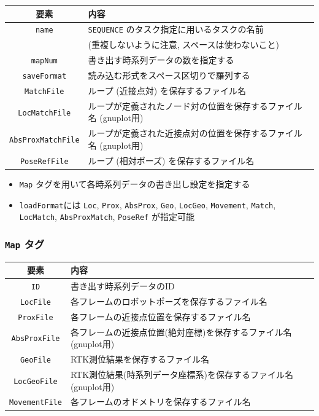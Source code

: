 \documentclass[dvipdfmx]{jsarticle}
\begin{document}
\begin{tabular}{c|l}
	\hline
	要素 & 内容 \\
	\hline \hline
	\verb|name| & \verb|SEQUENCE| のタスク指定に用いるタスクの名前 \vspace{-5pt}\\
		& (重複しないように注意, スペースは使わないこと) \\
	\verb|mapNum|  & 書き出す時系列データの数を指定する \\
	\verb|saveFormat|  & 読み込む形式をスペース区切りで羅列する \\
	\verb|MatchFile|  & ループ (近接点対) を保存するファイル名 \\
	\verb|LocMatchFile|  & ループが定義されたノード対の位置を保存するファイル名 (gnuplot用) \\
	\verb|AbsProxMatchFile|  & ループが定義された近接点対の位置を保存するファイル名 (gnuplot用) \\
	\verb|PoseRefFile|  & ループ (相対ポーズ) を保存するファイル名 \\
	\hline
\end{tabular}

\begin{itemize}
	\item \verb|Map| タグを用いて各時系列データの書き出し設定を指定する
	\item \verb|loadFormat|には \verb|Loc|, \verb|Prox|, \verb|AbsProx|, \verb|Geo|, \verb|LocGeo|, \verb|Movement|, \verb|Match|, \verb|LocMatch|, \verb|AbsProxMatch|, \verb|PoseRef| が指定可能
\end{itemize}

\cprotect \subsubsection{\verb|Map| タグ}
\begin{tabular}{c|l}
	\hline
	要素 & 内容 \\
	\hline \hline
	\verb|ID|  & 書き出す時系列データのID \\
	\verb|LocFile|  & 各フレームのロボットポーズを保存するファイル名 \\
	\verb|ProxFile|  & 各フレームの近接点位置を保存するファイル名 \\
	\verb|AbsProxFile|  & 各フレームの近接点位置(絶対座標)を保存するファイル名 (gnuplot用) \\
	\verb|GeoFile|  & RTK測位結果を保存するファイル名 \\
	\verb|LocGeoFile|  & RTK測位結果(時系列データ座標系)を保存するファイル名 (gnuplot用) \\
	\verb|MovementFile|  & 各フレームのオドメトリを保存するファイル名 \\
	\hline
\end{tabular}
\end{document}
